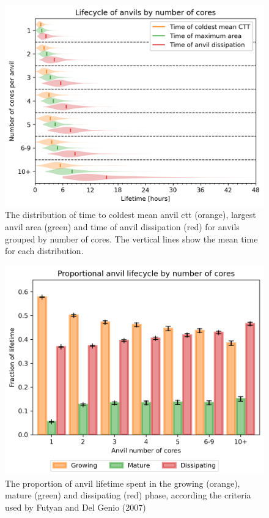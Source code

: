 \begin{figure}[t]
    \includegraphics[width=\textwidth]{figures/ch3_08.png}
    \caption[
    The distribution of time to coldest mean anvil \acrshort{ctt}, largest anvil area and time of anvil dissipation
    ]{
    The distribution of time to coldest mean anvil \acrshort{ctt} (orange), largest anvil area (green) and time of anvil dissipation (red) for anvils grouped by number of cores. The vertical lines show the mean time for each distribution.
    }
    \label{fig:seviri_lifetime_dists}
\end{figure}


\begin{figure}[t]
    \includegraphics[width=\textwidth]{figures/ch3_09.png}
    \caption[
    The proportion of anvil lifetime spent in the growing, mature and dissipating phase
    ]{
    The proportion of anvil lifetime spent in the growing (orange), mature (green) and dissipating (red) phase, according the criteria used by Futyan and Del Genio (2007)
    }
    \label{fig:seviri_lifetime_proportions}
\end{figure}


